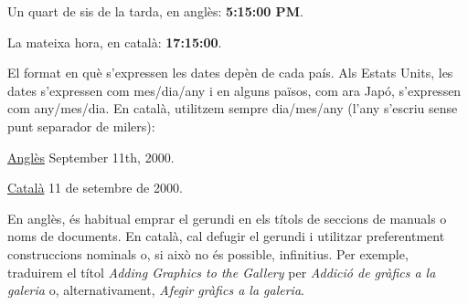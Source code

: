 \documentclass[9pt]{cheatsheet}
\begin{document}
\begin{multicols*}{3}
Un quart de sis de la tarda, en anglès: \textbf{5:15:00 PM}.

La mateixa hora, en català: \textbf{17:15:00}.

El format en què s’expressen les dates depèn de cada país. Als Estats Units, les dates s’expressen com mes/dia/any i en alguns països, com ara Japó, s’expressen com any/mes/dia. En català, utilitzem sempre dia/mes/any (l’any s’escriu sense punt separador de milers):

\underline {Anglès} September 11th, 2000.

\underline {Català}	11 de setembre de 2000.



En anglès, és habitual emprar el gerundi en els títols de seccions de manuals o noms de documents. En català, cal defugir el gerundi i utilitzar preferentment construccions nominals o, si això no és possible, infinitius. Per exemple, traduirem el títol \emph{Adding Graphics to the Gallery} per \emph{Addició de gràfics a la galeria} o, alternativament, \emph{Afegir gràfics a la galeria}.

\end{multicols*}
\end{document}
